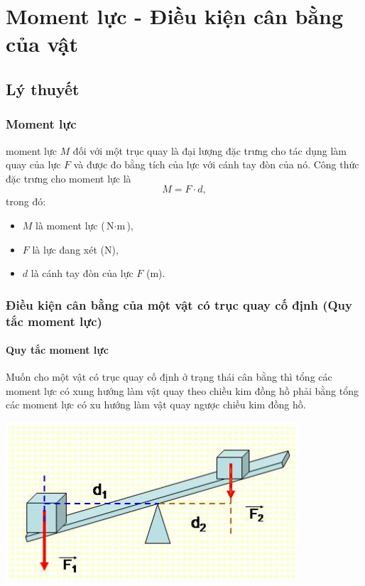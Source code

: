 \let\lesson\undefined
\newcommand{\lesson}{\phantomlesson{Bài 14: Moment lực. Điều kiện cân bằng của vật.}}
\chapter[Moment lực - Điều kiện cân bằng của vật]{Moment lực - Điều kiện cân bằng của vật}
\setcounter{section}{0}
\section{Lý thuyết}
\subsection{Moment lực}
moment lực $M$ đối với một trục quay là đại lượng đặc trưng cho tác dụng làm quay của lực $F$ và được đo bằng tích của lực với cánh tay đòn của nó. Công thức đặc trưng cho moment lực là 
\begin{equation*}
	M = F\cdot d, \label{eq1}
\end{equation*}
trong đó: 
\begin{itemize}
	\item $M$ là moment lực ($\si{\newton\cdot\meter}$), 
	\item $F$ là lực đang xét ($\si{\newton}$),
	\item $d$ là cánh tay đòn của lực $F$ ($\si{\meter}$).
\end{itemize}
\subsection{Điều kiện cân bằng của một vật có trục quay cố định (Quy tắc moment lực)}
\subsubsection{Quy tắc moment lực}

Muốn cho một vật có trục quay cố định ở trạng thái cân bằng thì tổng các moment lực có xung hướng làm vật quay theo chiều kim đồng hồ phải bằng tổng các moment lực có xu hướng làm vật quay ngược chiều kim đồng hồ.

\begin{center}
	\includegraphics[scale=0.5]{../figs/VN10-PH-21-L-016-2-V2-01.png}
\end{center}

